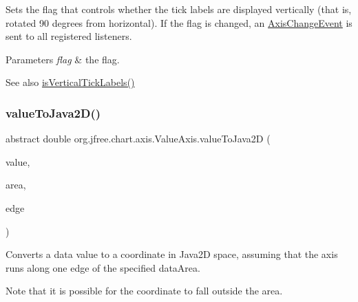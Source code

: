 Sets the flag that controls whether the tick labels are displayed vertically (that is, rotated 90 degrees from horizontal). If the flag is changed, an \mbox{\hyperlink{}{Axis\+Change\+Event}} is sent to all registered listeners.


\begin{DoxyParams}{Parameters}
{\em flag} & the flag.\\
\hline
\end{DoxyParams}
\begin{DoxySeeAlso}{See also}
\mbox{\hyperlink{classorg_1_1jfree_1_1chart_1_1axis_1_1_value_axis_a56e525f6ffdb6a75d1479f9d701db135}{is\+Vertical\+Tick\+Labels()}} 
\end{DoxySeeAlso}
\mbox{\label{classorg_1_1jfree_1_1chart_1_1axis_1_1_value_axis_ab5bb3a4ed5db8a846a76ffe4f2ce9c38}} 
\subsubsection{\texorpdfstring{value\+To\+Java2\+D()}{valueToJava2D()}}
{\footnotesize\ttfamily abstract double org.\+jfree.\+chart.\+axis.\+Value\+Axis.\+value\+To\+Java2D (\begin{DoxyParamCaption}\item[{double}]{value,  }\item[{Rectangle2D}]{area,  }\item[{Rectangle\+Edge}]{edge }\end{DoxyParamCaption})\hspace{0.3cm}{\ttfamily [abstract]}}

Converts a data value to a coordinate in Java2D space, assuming that the axis runs along one edge of the specified data\+Area. 

Note that it is possible for the coordinate to fall outside the area.


